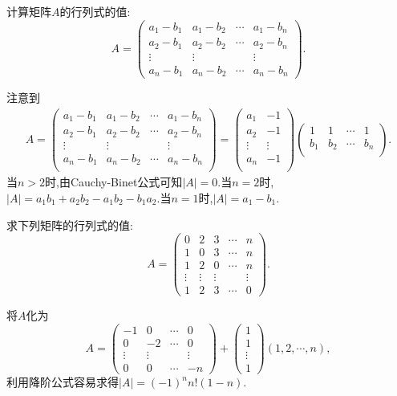 \documentclass[../../main.tex]{subfiles}
\begin{document}
\begin{example}
计算矩阵\(A\)的行列式的值:
\[
A = 
\begin{pmatrix}
a_1 - b_1 & a_1 - b_2 & \cdots & a_1 - b_n\\
a_2 - b_1 & a_2 - b_2 & \cdots & a_2 - b_n\\
\vdots & \vdots & & \vdots\\
a_n - b_1 & a_n - b_2 & \cdots & a_n - b_n
\end{pmatrix}.
\]
\end{example}
\begin{solution}
注意到\begin{align*}
A=\left( \begin{matrix}
a_1-b_1&		a_1-b_2&		\cdots&		a_1-b_n\\
a_2-b_1&		a_2-b_2&		\cdots&		a_2-b_n\\
\vdots&		\vdots&		&		\vdots\\
a_n-b_1&		a_n-b_2&		\cdots&		a_n-b_n\\
\end{matrix} \right) =\left( \begin{matrix}
a_1&		-1\\
a_2&		-1\\
\vdots&		\vdots\\
a_n&		-1\\
\end{matrix} \right) \left( \begin{matrix}
1&		1&		\cdots&		1\\
b_1&		b_2&		\cdots&		b_n\\
\end{matrix} \right) .
\end{align*}
当$n>2$时,由Cauchy-Binet公式可知$\left| A \right|=0$.当$n=2$时,$\left| A \right|=a_1b_1+a_2b_2-a_1b_2-b_1a_2$.当$n=1$时,$\left| A \right|=a_1-b_1$.
\end{solution}

\begin{example}
求下列矩阵的行列式的值:
\[
A = 
\begin{pmatrix}
0 & 2 & 3 & \cdots & n\\
1 & 0 & 3 & \cdots & n\\
1 & 2 & 0 & \cdots & n\\
\vdots & \vdots & \vdots & & \vdots\\
1 & 2 & 3 & \cdots & 0
\end{pmatrix}.
\]
\end{example}
\begin{solution}
将\(A\)化为
\[
A = 
\begin{pmatrix}
-1 & 0 & \cdots & 0\\
0 & -2 & \cdots & 0\\
\vdots & \vdots & & \vdots\\
0 & 0 & \cdots & -n
\end{pmatrix}
+
\begin{pmatrix}
1\\
1\\
\vdots\\
1
\end{pmatrix}
(1,2,\cdots,n),
\]
利用降阶公式容易求得\(|A| = (-1)^nn!(1 - n)\).
\end{solution}
\end{document}
